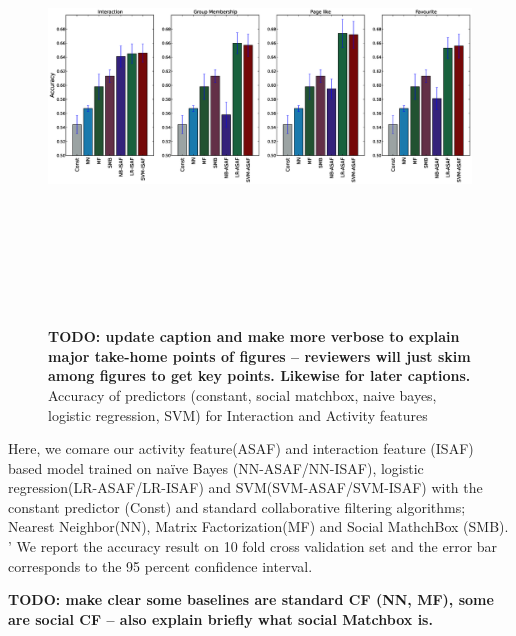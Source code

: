 \begin{figure}[tbp!]
\hspace{-6mm}\includegraphics[width=190mm,height=120mm]{data/plots/accuracy/accuracyLargeNew.eps}
\caption{ {\bf TODO: update caption and make more verbose to explain major take-home points of figures -- reviewers will just skim among figures to get key points.  Likewise for later captions.}  Accuracy of predictors (constant, social matchbox, naive bayes, logistic regression, SVM) for Interaction and Activity  features }
\label{Fig1}
\end{figure}


Here, we comare our activity feature(ASAF) and interaction feature (ISAF) based model trained on na\"{i}ve Bayes (NN-ASAF/NN-ISAF), logistic regression(LR-ASAF/LR-ISAF) and SVM(SVM-ASAF/SVM-ISAF)  with the constant predictor (Const) and  standard collaborative filtering algorithms; Nearest Neighbor(NN),  Matrix Factorization(MF) and Social MathchBox (SMB). '
We report the accuracy result on 10 fold cross validation set and the error bar corresponds to the 95 percent confidence interval.

{\bf TODO: make clear some baselines are standard CF (NN, MF), some are social CF -- also explain
           briefly what social Matchbox is.}

